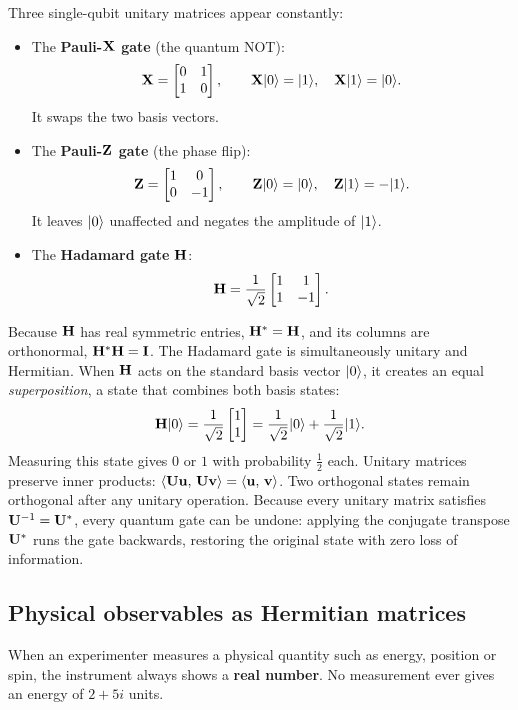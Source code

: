 Three single-qubit unitary matrices appear constantly:
\begin{itemize}
  \item The \textbf{Pauli-$\mathbf{X}$ gate} (the quantum NOT):
  \[
    \mathbf{X} = \begin{bmatrix}0 & 1 \\ 1 & 0\end{bmatrix}, \qquad
    \mathbf{X}\lvert 0 \rangle = \lvert 1 \rangle, \quad \mathbf{X}\lvert 1 \rangle = \lvert 0 \rangle.
  \]
  It swaps the two basis vectors.
  \item The \textbf{Pauli-$\mathbf{Z}$ gate} (the phase flip):
  \[
    \mathbf{Z} = \begin{bmatrix}1 & 0 \\ 0 & -1\end{bmatrix}, \qquad
    \mathbf{Z}\lvert 0 \rangle = \lvert 0 \rangle, \quad \mathbf{Z}\lvert 1 \rangle = -\lvert 1 \rangle.
  \]
  It leaves $\lvert 0 \rangle$ unaffected and negates the amplitude of $\lvert 1 \rangle$.
  \item The \textbf{Hadamard gate} $\mathbf{H}$:
  \[
    \mathbf{H} = \frac{1}{\sqrt{2}}\begin{bmatrix}1 & 1 \\ 1 & -1\end{bmatrix}.
  \]
\end{itemize}
Because $\mathbf{H}$ has real symmetric entries, $\mathbf{H}^* = \mathbf{H}$, and its columns
are orthonormal, $\mathbf{H}^*\mathbf{H} = \mathbf{I}$. The Hadamard gate is simultaneously
unitary and Hermitian. When $\mathbf{H}$ acts on the standard basis vector $\lvert 0 \rangle$,
it creates an equal \emph{superposition}, a state that combines both basis
states:
\[
  \mathbf{H}\lvert 0 \rangle = \frac{1}{\sqrt{2}}\begin{bmatrix}1\\1\end{bmatrix}
  = \frac{1}{\sqrt{2}}\lvert 0 \rangle + \frac{1}{\sqrt{2}}\lvert 1 \rangle.
\]
Measuring this state gives $0$ or $1$ with probability $\tfrac12$ each.
Unitary matrices preserve inner products:
$\langle \mathbf{U}\mathbf{u},\, \mathbf{U}\mathbf{v} \rangle = \langle \mathbf{u},\, \mathbf{v} \rangle$. Two orthogonal
states remain orthogonal after any unitary operation. Because every unitary matrix
satisfies $\mathbf{U}^{-1} = \mathbf{U}^*$, every quantum gate can be undone:
applying the conjugate transpose $\mathbf{U}^*$ runs the gate backwards, restoring
the original state with zero loss of information.

\subsection{Physical observables as Hermitian matrices}

When an experimenter measures a physical quantity such as energy, position or
spin, the instrument always shows a \textbf{real number}. No measurement ever
gives an energy of $2 + 5i$ units.

